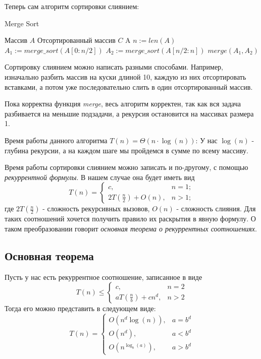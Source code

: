 \documentclass[../main.tex]{subfiles}
\begin{document}
	Теперь сам алгоритм сортировки слиянием:
	\begin{algorithm}[H]
		\caption{Merge Sort}
		\begin{algorithmic}[1]
			\Require Массив $A$
			\Ensure Отсортированный массив $C$
					\State \Return A
				\Else
					\State $n := len(A)$
					\State $A_1 := merge\_sort(A[0: n/2])$
					\State $A_2 := merge\_sort(A[n/2: n])$
					\State \Return $merge(A_1, A_2)$
				\EndIf
		
			\EndFunction
		\end{algorithmic}
	\end{algorithm}
	\begin{remark}
		Сортировку слиянием можно написать разными способами. Например, изначально разбить массив на куски длиной 10, каждую из них отсортировать вставками, а потом уже последовательно слить в один отсортированный массив.
	\end{remark}
	\begin{proof_cor}
		Пока корректна функция \textit{merge}, весь алгоритм корректен, так как вся задача разбивается на меньшие подзадачи, а рекурсия остановится на массивах размера 1.
	\end{proof_cor}
	\begin{time}
		Время работы данного алгоритма $T(n) = \Theta(n\cdot \log(n))$: У нас $\log(n)$ - глубина рекурсии, а на каждом шаге мы пройдемся в сумме по всему массиву. 
		
	\end{time} 
	
	
	Время работы сортировки слиянием можно записать и по-другому, с помощью \textit{рекуррентной формулы}. В нашем случае она будет иметь вид
	\[
	T(n) = 
	\begin{cases}
		c, & n = 1; \\
		2T(\frac{n}{2}) + O(n), & n > 1;
	\end{cases}
	\]
	где $2T(\frac{n}{2})$ - сложность рекурсивных вызовов, $O(n)$ - сложность слияния. Для таких соотношений хочется получить правило их раскрытия в явную формулу. О таком преобразовании говорит \textit{основная теорема о рекуррентных соотношениях}.
	
	\subsection{Основная теорема}
	
	\begin{theorem}
		Пусть у нас есть рекуррентное соотношение, записанное в виде
		\[
		T(n) \leqslant
		\begin{cases}
		c, & n = 2\\
		aT(\frac{n}{b}) + cn^d, & n > 2
		\end{cases}
		\]
		Тогда его можно представить в следующем виде:
		\[
		T(n) = 
		\begin{cases}
		O(n^d \log(n)), & a = b^d \\
		O(n^d), & a < b^d \\
		O(n^{\log_b(a)}), & a > b^d
		\end{cases}
		\]
	\end{theorem}
	
\end{document}
